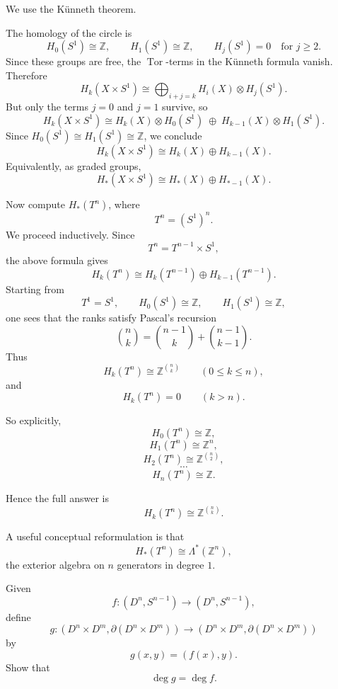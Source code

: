 \begin{solution}
We use the K\"unneth theorem.

The homology of the circle is
\[
H_0(S^1)\cong \mathbb Z,\qquad
H_1(S^1)\cong \mathbb Z,\qquad
H_j(S^1)=0 \quad \text{for }j\ge 2.
\]
Since these groups are free, the \(\operatorname{Tor}\)-terms in the K\"unneth formula vanish. Therefore
\[
H_k(X\times S^1)\cong \bigoplus_{i+j=k} H_i(X)\otimes H_j(S^1).
\]
But only the terms \(j=0\) and \(j=1\) survive, so
\[
H_k(X\times S^1)\cong H_k(X)\otimes H_0(S^1)\;\oplus\; H_{k-1}(X)\otimes H_1(S^1).
\]
Since \(H_0(S^1)\cong H_1(S^1)\cong \mathbb Z\), we conclude
\[
H_k(X\times S^1)\cong H_k(X)\oplus H_{k-1}(X).
\]
Equivalently, as graded groups,
\[
H_*(X\times S^1)\cong H_*(X)\oplus H_{*-1}(X).
\]

\par

Now compute \(H_*(T^n)\), where
\[
T^n=(S^1)^n.
\]
We proceed inductively. Since
\[
T^n=T^{n-1}\times S^1,
\]
the above formula gives
\[
H_k(T^n)\cong H_k(T^{n-1})\oplus H_{k-1}(T^{n-1}).
\]
Starting from
\[
T^1=S^1,\qquad H_0(S^1)\cong \mathbb Z,\qquad H_1(S^1)\cong \mathbb Z,
\]
one sees that the ranks satisfy Pascal's recursion
\[
\binom{n}{k}=\binom{n-1}{k}+\binom{n-1}{k-1}.
\]
Thus
\[
H_k(T^n)\cong \mathbb Z^{\binom{n}{k}}
\qquad (0\le k\le n),
\]
and
\[
H_k(T^n)=0\qquad (k>n).
\]

So explicitly,
\[
H_0(T^n)\cong \mathbb Z,
\]
\[
H_1(T^n)\cong \mathbb Z^n,
\]
\[
H_2(T^n)\cong \mathbb Z^{\binom{n}{2}},
\]
\[
\cdots
\]
\[
H_n(T^n)\cong \mathbb Z.
\]

Hence the full answer is
\[
\boxed{H_k(T^n)\cong \mathbb Z^{\binom{n}{k}}.}
\]

A useful conceptual reformulation is that
\[
H_*(T^n)\cong \Lambda^*(\mathbb Z^n),
\]
the exterior algebra on \(n\) generators in degree \(1\).
\end{solution}

\begin{problem}[CP-VIII-0048 --- Degree of the product map \(g(x,y)=(f(x),y)\)]
Given
\[
f:(D^n,S^{n-1})\to (D^n,S^{n-1}),
\]
define
\[
g:(D^n\times D^m,\partial(D^n\times D^m))\to (D^n\times D^m,\partial(D^n\times D^m))
\]
by
\[
g(x,y)=(f(x),y).
\]
Show that
\[
\deg g=\deg f.
\]

\par
\end{problem}


